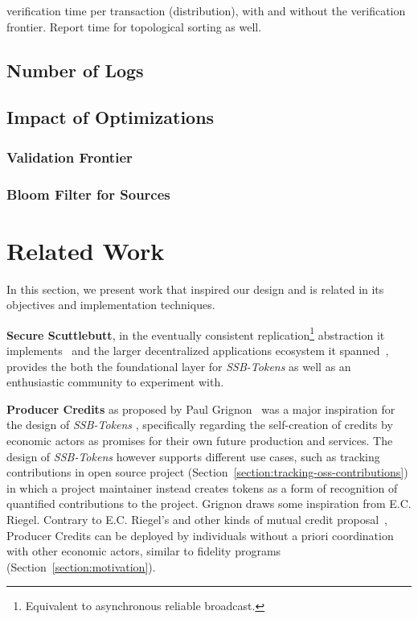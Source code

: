 \documentclass[sigplan,screen,10pt]{acmart}
\newcommand\ssbtokens[0]{\textit{SSB-Tokens} }
\begin{document}
verification time per transaction (distribution), with and without the verification frontier. Report time for topological sorting as well.

\subsection{Number of Logs}

\subsection{Impact of Optimizations}

\subsubsection{Validation Frontier}

\subsubsection{Bloom Filter for Sources}


\section{Related Work}
\label{section:related-work}

In this section, we present work that inspired our design and is related in its objectives and implementation techniques.

\textbf{Secure Scuttlebutt}, in the eventually consistent replication\footnote{Equivalent to asynchronous reliable broadcast.} abstraction it implements~\cite{kermarrec2020gossiping} and the larger decentralized applications ecosystem it spanned~\cite{tarr2019ssb}, provides the both the foundational layer for \ssbtokens as well as an enthusiastic community to experiment with.

\textbf{Producer Credits} as proposed by Paul Grignon~\cite{producercredit} was a major inspiration for the design of \ssbtokens, specifically regarding the self-creation of credits by economic actors as promises for their own future production and services. The design of \ssbtokens however supports different use cases, such as tracking contributions in open source project (Section~\ref{section:tracking-oss-contributions}) in which a project maintainer instead creates tokens as a form of recognition of quantified contributions to the project. Grignon draws some inspiration from E.C. Riegel. Contrary to E.C. Riegel's and other kinds of mutual credit proposal~\cite{mutualcredit}, Producer Credits can be deployed by individuals without a priori coordination with other economic actors, similar to fidelity programs (Section~\ref{section:motivation}).
\end{document}
